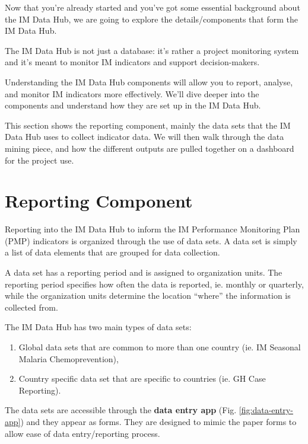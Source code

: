 \documentclass[]{book}
\providecommand{\tightlist}{%
  \setlength{\itemsep}{0pt}\setlength{\parskip}{0pt}}
\begin{document}
Now that you're already started and you've got some essential background about the IM Data Hub, we are going to explore the details/components that form the IM Data Hub.

The IM Data Hub is not just a database: it's rather a project monitoring system and it's meant to monitor IM indicators and support decision-makers.

Understanding the IM Data Hub components will allow you to report, analyse, and monitor IM indicators more effectively. We'll dive deeper into the components and understand how they are set up in the IM Data Hub.

This section shows the reporting component, mainly the data sets that the IM Data Hub uses to collect indicator data. We will then walk through the data mining piece, and how the different outputs are pulled together on a dashboard for the project use.

\hypertarget{reporting-component}{%
\section{Reporting Component}\label{reporting-component}}

Reporting into the IM Data Hub to inform the IM Performance Monitoring Plan (PMP) indicators is organized through the use of data sets. A data set is simply a list of data elements that are grouped for data collection.

A data set has a reporting period and is assigned to organization units. The reporting period specifies how often the data is reported, ie. monthly or quarterly, while the organization units determine the location ``where'' the information is collected from.

The IM Data Hub has two main types of data sets:

\begin{enumerate}
\def\labelenumi{\arabic{enumi}.}
\tightlist
\item
  Global data sets that are common to more than one country (ie. IM Seasonal Malaria Chemoprevention),
\item
  Country specific data set that are specific to countries (ie. GH Case Reporting).
\end{enumerate}

The data sets are accessible through the \textbf{data entry app} (Fig. \ref{fig:data-entry-app}) and they appear as forms. They are designed to mimic the paper forms to allow ease of data entry/reporting process.
\end{document}
